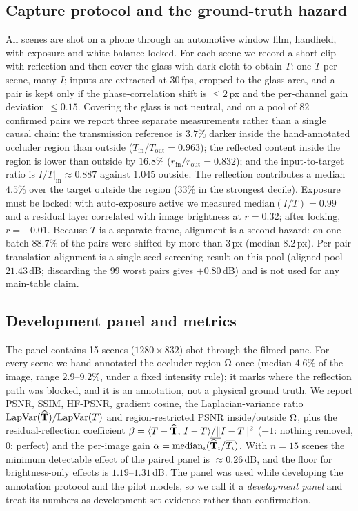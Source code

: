 \subsection{Capture protocol and the ground-truth hazard}
\label{sec:protocol}

All scenes are shot on a phone through an automotive window film, handheld, with
exposure and white balance locked. For each scene we record a short clip with reflection
and then cover the glass with dark cloth to obtain $T$: one $T$ per scene, many $I$;
inputs are extracted at 30\,fps, cropped to the glass area, and a pair is kept only if
the phase-correlation shift is $\le2$\,px and the per-channel gain deviation
$\le0.15$. Covering the glass is not neutral, and on a pool of $82$ confirmed pairs we
report three separate measurements rather than a single causal chain: the transmission
reference is $3.7\%$ darker inside the hand-annotated occluder region than outside
($T_{\mathrm{in}}/T_{\mathrm{out}}=0.963$); the reflected content inside the region is
lower than outside by $16.8\%$ ($r_{\mathrm{in}}/r_{\mathrm{out}}=0.832$); and the
input-to-target ratio is $I/T|_{\mathrm{in}}\approx0.887$ against $1.045$ outside. The
reflection contributes a median $4.5\%$ over the target outside the region ($33\%$ in the
strongest decile). Exposure must be locked: with auto-exposure active we measured
$\mathrm{median}(I/T)=0.99$ and a residual layer correlated with image brightness at
$r=0.32$; after locking, $r=-0.01$. Because $T$ is a separate frame, alignment is a
second hazard: on one batch $88.7\%$ of the pairs were shifted by more than $3$\,px
(median $8.2$\,px). Per-pair translation alignment is a single-seed screening result on
this pool (aligned pool $21.43$\,dB; discarding the $99$ worst pairs gives $+0.80$\,dB)
and is not used for any main-table claim.

\subsection{Development panel and metrics}
\label{sec:panel}

The panel contains 15 scenes ($1280{\times}832$) shot through the filmed pane. For every
scene we hand-annotated the occluder region $\Omega$ once (median $4.6\%$ of the image,
range $2.9$--$9.2\%$, under a fixed intensity rule); it marks where the reflection path
was blocked, and it is an annotation, not a physical ground truth. We report PSNR, SSIM,
HF-PSNR, gradient cosine, the Laplacian-variance ratio
$\mathrm{LapVar}(\widehat{\mathbf{T}})/\mathrm{LapVar}(T)$ and region-restricted PSNR inside/outside
$\Omega$, plus the residual-reflection coefficient
$\beta=\langle T-\widehat{\mathbf{T}},\,I-T\rangle/\lVert I-T\rVert^{2}$ ($-1$: nothing removed, $0$:
perfect) and the per-image gain
$\alpha=\mathrm{median}_i(\overline{\widehat{\mathbf{T}}_i}/\overline{T_i})$. With $n=15$ scenes the
minimum detectable effect of the paired panel is $\approx0.26$\,dB, and the floor for
brightness-only effects is $1.19$--$1.31$\,dB. The panel was used while developing the
annotation protocol and the pilot models, so we call it a \emph{development panel} and
treat its numbers as development-set evidence rather than confirmation.
